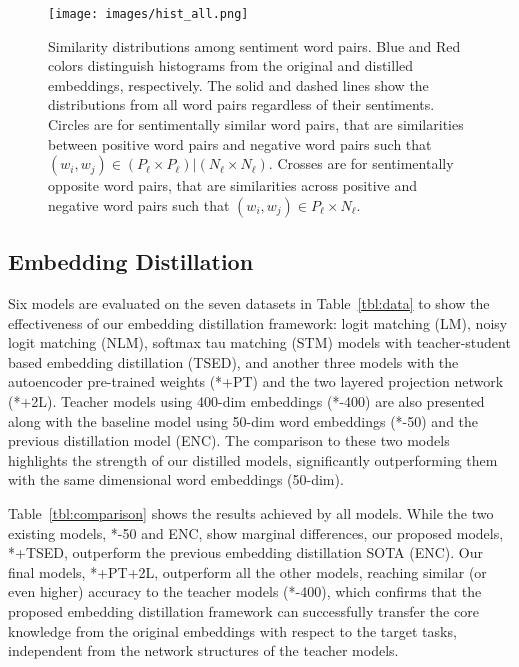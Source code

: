 \documentclass{article}
\begin{document}
\begin{figure}[hbt!]
	\centering
\texttt{[image: images/hist\_all.png]}
	\caption{Similarity distributions among sentiment word pairs. 
		Blue and Red colors distinguish histograms from the original and distilled embeddings, respectively.
		The solid and dashed lines show the distributions from all word pairs regardless of their sentiments.
		Circles are for sentimentally similar word pairs, that are similarities between positive word pairs and negative word pairs such that $(w_i, w_j) \in (P_\ell \times P_\ell) | (N_\ell \times N_\ell)$. Crosses are for sentimentally opposite word pairs, that are similarities across positive and negative word pairs such that $(w_i, w_j) \in P_\ell \times N_\ell$.
	}
	\label{fig:lexicon}
	\vspace{-1ex}
\end{figure}







\subsection{Embedding Distillation}

Six models are evaluated on the seven datasets in Table~\ref{tbl:data} to show the effectiveness of our embedding distillation framework:
logit matching (LM), noisy logit matching (NLM), softmax tau matching (STM) models with teacher-student based embedding distillation (TSED), and another three models with the autoencoder pre-trained weights (*+PT) and the two layered projection network (*+2L).
Teacher models using 400-dim embeddings (*-400) are also presented along with the baseline model using 50-dim word embeddings (*-50) and the previous distillation model (ENC).
The comparison to these two models highlights the strength of our distilled models, significantly outperforming them with the same dimensional word embeddings (50-dim).

Table~\ref{tbl:comparison} shows the results achieved by all models.
While the two existing models, *-50 and ENC, show marginal differences, our proposed models, *+TSED, outperform the previous embedding distillation SOTA (ENC).
Our final models, *+PT+2L, outperform all the other models, reaching similar (or even higher) accuracy to the teacher models (*-400), which confirms that the proposed embedding distillation framework can successfully transfer the core knowledge from the original embeddings with respect to the target tasks, independent from the network structures of the teacher models.
\end{document}
